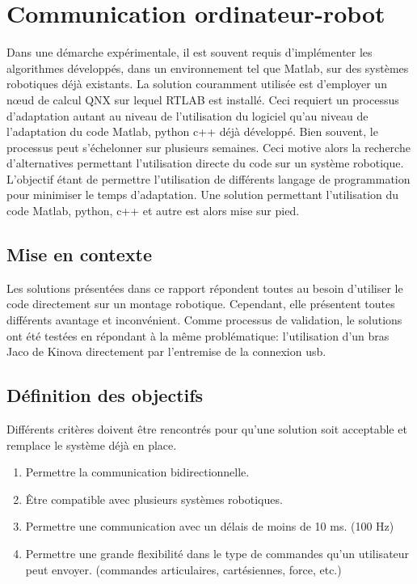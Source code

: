 \section{Communication ordinateur-robot}

Dans une démarche expérimentale, il est souvent requis d'implémenter les algorithmes développés, dans un environnement tel que Matlab, sur des systèmes robotiques déjà existants. 
La solution couramment utilisée est d'employer un nœud de calcul QNX sur lequel RTLAB est installé. 
Ceci requiert un processus d'adaptation autant au niveau de l'utilisation du logiciel qu'au niveau de l'adaptation du code Matlab, python c++ déjà développé. 
Bien souvent, le processus peut s'échelonner sur plusieurs semaines. 
Ceci motive alors la recherche d'alternatives permettant l'utilisation directe du code sur un système robotique. 
L'objectif étant de permettre l'utilisation de différents langage de programmation pour minimiser le temps d'adaptation. 
Une solution permettant l'utilisation du code Matlab, python, c++ et autre est alors mise sur pied.

\subsection{Mise en contexte}

Les solutions présentées dans ce rapport répondent toutes au besoin d'utiliser le code directement sur un montage robotique. 
Cependant, elle présentent toutes différents avantage et inconvénient. 
Comme processus de validation, le solutions ont été testées en répondant à la même problématique: l'utilisation d'un bras Jaco de Kinova directement par l'entremise de la connexion usb.


\subsection{Définition des objectifs}

Différents critères doivent être rencontrés pour qu'une solution soit acceptable et remplace le système déjà en place.

\begin{enumerate}
\item Permettre la communication bidirectionnelle.
\item Être compatible avec plusieurs systèmes robotiques.
\item Permettre une communication avec un délais de moins de 10 ms. (100 Hz)
\item Permettre une grande flexibilité dans le type de commandes qu'un utilisateur peut envoyer. (commandes articulaires, cartésiennes, force, etc.)
\end{enumerate}

